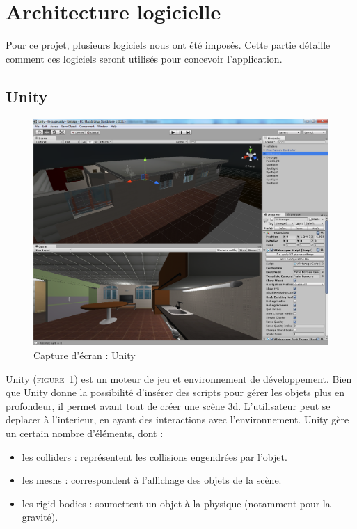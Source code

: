 \section{Architecture logicielle}
Pour ce projet, plusieurs logiciels nous ont été imposés. Cette partie détaille comment ces logiciels seront utilisés pour concevoir l'application.

\subsection{Unity}
\begin{figure}[h]
  \includegraphics[width=1\textwidth]{4-Conception/img/unity_screenshot.png}
  \caption{Capture d'écran : Unity}
  \label{unity}
\end{figure}

Unity (\textsc{figure~\ref{unity}}) est un moteur de jeu et environnement de développement. Bien que Unity donne la possibilité d'insérer des scripts pour gérer les objets plus en profondeur, il permet avant tout de créer une scène 3d. L'utilisateur peut se deplacer à l'interieur, en ayant des interactions avec l'environnement. Unity gère un certain nombre d'éléments, dont :
\begin{itemize}
        \item les colliders : représentent les collisions engendrées par l'objet.
        \item les meshs : correspondent à l'affichage des objets de la scène.
        \item les rigid bodies : soumettent un objet à la physique (notamment pour la gravité).
\end{itemize}


